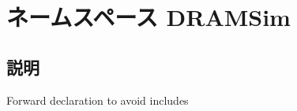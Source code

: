 \hypertarget{namespaceDRAMSim}{
\section{ネームスペース DRAMSim}
\label{namespaceDRAMSim}
}


\subsection{説明}
Forward declaration to avoid includes 
